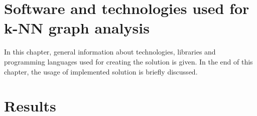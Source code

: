 \documentclass[a4paper,11pt]{article}
\begin{document}

\clearpage
\section{Software and technologies used for k-NN graph analysis}
In this chapter, general information about technologies, libraries and programming languages used for creating the solution is given.
In the end of this chapter, the usage of implemented solution is briefly discussed.



\clearpage
\section{Results}




%


\clearpage
\label{Bibliography} 
%

\footnotesize{  }


%
%
%
\end{document}
